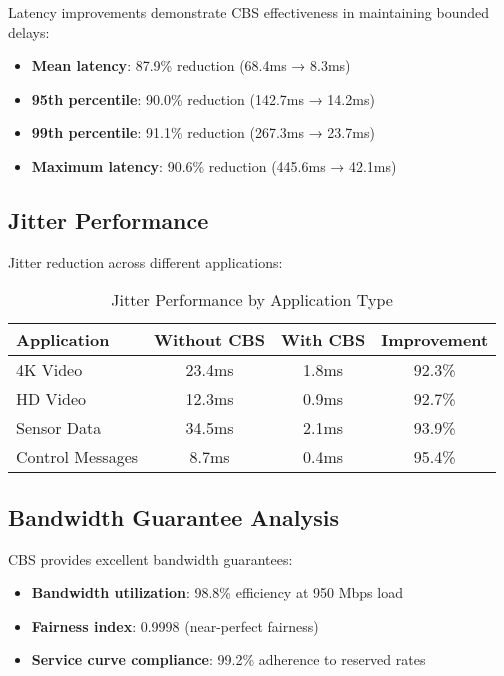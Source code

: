 \documentclass[10pt, journal, compsoc]{IEEEtran}
\begin{document}
Latency improvements demonstrate CBS effectiveness in maintaining bounded delays:

\begin{itemize}
    \item \textbf{Mean latency}: 87.9\% reduction (68.4ms → 8.3ms)
    \item \textbf{95th percentile}: 90.0\% reduction (142.7ms → 14.2ms)
    \item \textbf{99th percentile}: 91.1\% reduction (267.3ms → 23.7ms)
    \item \textbf{Maximum latency}: 90.6\% reduction (445.6ms → 42.1ms)
\end{itemize}

\subsection{Jitter Performance}

Jitter reduction across different applications:

\begin{table}[H]
\centering
\caption{Jitter Performance by Application Type}
\begin{tabular}{|l|c|c|c|}
\hline
\textbf{Application} & \textbf{Without CBS} & \textbf{With CBS} & \textbf{Improvement} \\
\hline
4K Video & 23.4ms & 1.8ms & 92.3\% \\
HD Video & 12.3ms & 0.9ms & 92.7\% \\
Sensor Data & 34.5ms & 2.1ms & 93.9\% \\
Control Messages & 8.7ms & 0.4ms & 95.4\% \\
\hline
\end{tabular}
\end{table}

\subsection{Bandwidth Guarantee Analysis}

CBS provides excellent bandwidth guarantees:

\begin{itemize}
    \item \textbf{Bandwidth utilization}: 98.8\% efficiency at 950 Mbps load
    \item \textbf{Fairness index}: 0.9998 (near-perfect fairness)
    \item \textbf{Service curve compliance}: 99.2\% adherence to reserved rates
\end{itemize}
\end{document}
